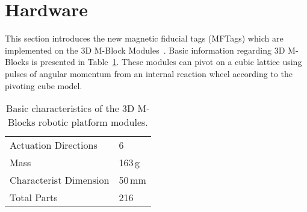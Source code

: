 \section{Hardware}
\label{sec:Hardware}

This section introduces the new magnetic fiducial tags (MFTags) which are implemented on the 3D M-Block Modules~\cite{Romanishin20153d}. Basic information regarding 3D M-Blocks is presented in Table~\ref{tab:hardwareOverviewTable}. These modules can pivot on a cubic lattice using pulses of angular momentum from an internal reaction wheel according to the pivoting cube model.
\begin{table}[h]
	\caption{Basic characteristics of the 3D M-Blocks robotic platform modules.}
	\centering
	\begin{tabular}{ p{3.5cm}  p{2cm} }
		\hline
		Actuation Directions & 6 \\
		Mass  & 163\,g \\
		Characterist Dimension & 50\,mm \\
		Total Parts  & 216 \\
	\end{tabular}
	\label{tab:hardwareOverviewTable}
\end{table}

